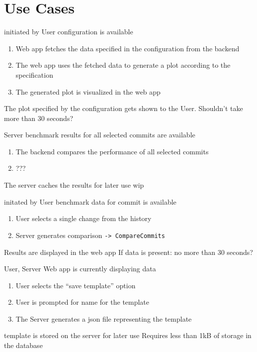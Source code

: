 \section{Use Cases}

{initiated by User}
{configuration is available}
{\begin{enumerate}
    \item Web app fetches the data specified in the configuration from the backend
    \item The web app uses the fetched data to generate a plot according to the specification
    \item The generated plot is visualized in the web app
\end{enumerate}}
{The plot specified by the configuration gets shown to the User.}
{Shouldn't take more than 30 seconds?}

\bigskip

{Server}
{benchmark results for all selected commits are available}
{\begin{enumerate}
    \item The backend compares the performance of all selected commits
    \item ???
\end{enumerate}}
{The server caches the results for later use}
{wip}

\bigskip

{initated by User}
{benchmark data for commit is available}
{\begin{enumerate}
    \item User selects a single change from the history
    \item Server generates comparison \texttt{-> CompareCommits}
\end{enumerate}}
{Results are displayed in the web app}
{If data is present: no more than 30 seconds?}

\bigskip

{User, Server}
{Web app is currently displaying data}
{\begin{enumerate}
    \item User selects the \enquote{save template} option
    \item User is prompted for name for the \gls{template}
    \item The Server generates a \acrshort{json} file representing the \gls{template}
\end{enumerate}} 
{\Gls{template} is stored on the server for later use}
{Requires less than 1kB of storage in the database}

